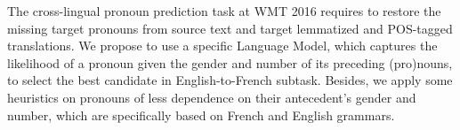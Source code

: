 The cross-lingual pronoun prediction task at WMT 2016 requires to restore the missing target pronouns  from source text and target lemmatized and POS-tagged translations.  We propose to use a specific Language Model, which captures the likelihood of a pronoun given the gender and number of its preceding (pro)nouns, to select the best candidate in English-to-French subtask. Besides, we apply some heuristics on pronouns of less dependence on their antecedent's gender and number, which are specifically based on French and English grammars.
